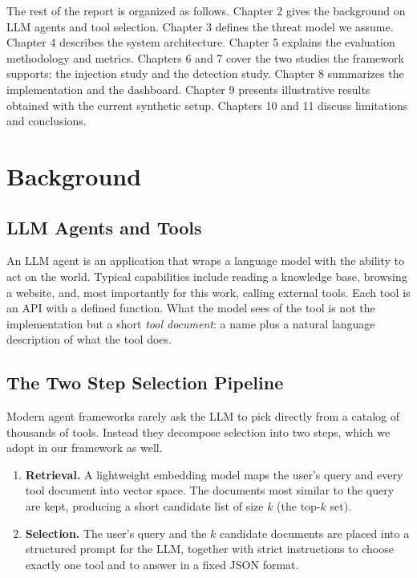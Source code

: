 \documentclass[11pt,a4paper]{report}
\begin{document}
The rest of the report is organized as follows. Chapter 2 gives the
background on LLM agents and tool selection. Chapter 3 defines the threat
model we assume. Chapter 4 describes the system architecture. Chapter 5
explains the evaluation methodology and metrics. Chapters 6 and 7 cover
the two studies the framework supports: the injection study and the
detection study. Chapter 8 summarizes the implementation and the
dashboard. Chapter 9 presents illustrative results obtained with the
current synthetic setup. Chapters 10 and 11 discuss limitations and
conclusions.

\chapter{Background}

\section{LLM Agents and Tools}

An LLM agent is an application that wraps a language model with the
ability to act on the world. Typical capabilities include reading a
knowledge base, browsing a website, and, most importantly for this work,
calling external tools. Each tool is an API with a defined function. What
the model sees of the tool is not the implementation but a short
\emph{tool document}: a name plus a natural language description of what
the tool does.

\section{The Two Step Selection Pipeline}

Modern agent frameworks rarely ask the LLM to pick directly from a
catalog of thousands of tools. Instead they decompose selection into two
steps, which we adopt in our framework as well.

\begin{enumerate}
  \item \textbf{Retrieval.} A lightweight embedding model maps the user's
  query and every tool document into vector space. The documents most
  similar to the query are kept, producing a short candidate list of size
  $k$ (the top-$k$ set).
  \item \textbf{Selection.} The user's query and the $k$ candidate
  documents are placed into a structured prompt for the LLM, together
  with strict instructions to choose exactly one tool and to answer in a
  fixed JSON format.
\end{enumerate}
\end{document}
